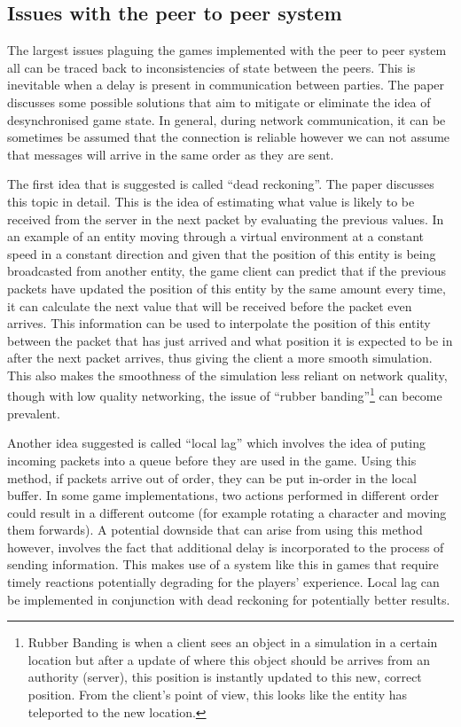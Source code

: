 \subsection{Issues with the peer to peer system}
The largest issues plaguing the games implemented with the peer to peer system all can be traced back to inconsistencies of state between the peers. This is inevitable when a delay is present in communication between parties. The paper  discusses some possible solutions that aim to mitigate or eliminate the idea of desynchronised game state. In general, during network communication, it can be sometimes be assumed that the connection is reliable however we can not assume that messages will arrive in the same order as they are sent.

The first idea that is suggested is called ``dead reckoning''. The paper  discusses this topic in detail. This is the idea of estimating what value is likely to be received from the server in the next packet by evaluating the previous values. In an example of an entity moving through a virtual environment at a constant speed in a constant direction and given that the position of this entity is being broadcasted from another entity, the game client can predict that if the previous packets have updated the position of this entity by the same amount every time, it can calculate the next value that will be received before the packet even arrives. This information can be used to interpolate the position of this entity between the packet that has just arrived and what position it is expected to be in after the next packet arrives, thus giving the client a more smooth simulation. This also makes the smoothness of the simulation less reliant on network quality, though with low quality networking, the issue of ``rubber banding''\footnote{Rubber Banding is when a client sees an object in a simulation in a certain location but after a update of where this object should be arrives from an authority (server), this position is instantly updated to this new, correct position. From the client's point of view, this looks like the entity has teleported to the new location.} can become prevalent.

Another idea suggested is called ``local lag'' which involves the idea of puting incoming packets into a queue before they are used in the game. Using this method, if packets arrive out of order, they can be put in-order in the local buffer. In some game implementations, two actions performed in different order could result in a different outcome (for example rotating a character and moving them forwards). A potential downside that can arise from using this method however, involves the fact that additional delay is incorporated to the process of sending information. This makes use of a system like this in games that require timely reactions potentially degrading for the players' experience. Local lag can be implemented in conjunction with dead reckoning for potentially better results.

